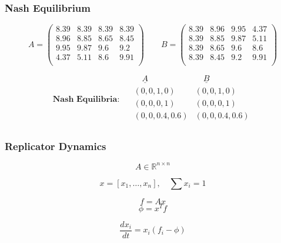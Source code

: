 \begin{frame}
    \frametitle{Nash Equilibrium}
    \centering

    \small
    \begin{equation*}
        A = 
        \begin{pmatrix}
            8.39 & 8.39 & 8.39 & 8.39 \\
            8.96 & 8.85 & 8.65 & 8.45 \\
            9.95 & 9.87 & 9.6  & 9.2  \\
            4.37 & 5.11 & 8.6  & 9.91 \\
        \end{pmatrix} \qquad
        B = 
        \begin{pmatrix}
            8.39 & 8.96 & 9.95 & 4.37 \\
            8.39 & 8.85 & 9.87 & 5.11 \\
            8.39 & 8.65 & 9.6 &  8.6 \\ 
            8.39 & 8.45 & 9.2 &  9.91 \\
        \end{pmatrix}
    \end{equation*}

    \vspace{1cm}

    \begin{equation*}
        \textbf{Nash Equilibria: } \quad
        \begin{array}{c|c}
            \underline{\quad A \quad} & \underline{\quad B \quad} \\
            (0, 0, 1, 0) & (0, 0, 1, 0) \\ 
            \hline
            (0, 0, 0, 1) & (0, 0, 0, 1) \\ 
            \hline
            (0, 0, 0.4, 0.6) & (0, 0, 0.4, 0.6) \\
        \end{array}
    \end{equation*}
\end{frame}


\begin{frame}
    \frametitle{Replicator Dynamics}
    \centering

    \[
        A \in \mathbb{R}^{n \times n}
    \]

    \[
        x = [x_1, \dots, x_n], \quad \sum{x_i} = 1
    \]

    \[
        f = A x
    \]
    \vspace{-0.8cm}
    \[  
        \phi = x^T f
    \]

    \[
        \frac{dx_i}{dt} = x_i(f_i - \phi)
    \]
    
\end{frame}


